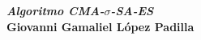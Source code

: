 \textbf{\textit{Algoritmo CMA-}}$\bm{\mathit{\sigma}}$\textbf{\textit{-SA-ES}}\\

\textbf{Giovanni Gamaliel López Padilla}\\
